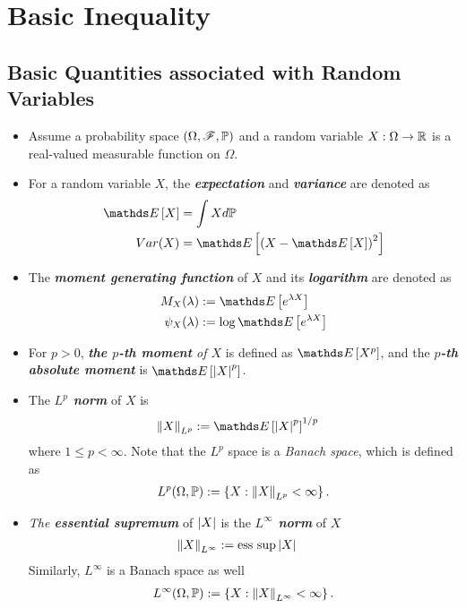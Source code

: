 \documentclass[11pt]{article}
\begin{document}
\section{Basic Inequality}
\subsection{Basic Quantities associated with Random Variables}
\begin{itemize}
\item Assume a probability space $(\Omega, {\mathscr F}, {\mathbb P})$ and a random variable $X: \Omega \to {\mathbb R}$ is a real-valued measurable function on $\Omega$.

\item For a random variable $X$, the \emph{\textbf{expectation}} and \emph{\textbf{variance}} are denoted as
\begin{align*}
\E{}{X} &= \int X d\bP \\
Var(X) &= \E{}{\paren{X - \E{}{X}}^2}
\end{align*}

\item The \emph{\textbf{moment generating function}} of $X$ and its \emph{\textbf{logarithm}} are denoted as
\begin{align*}
M_{X}(\lambda) &:= \E{}{e^{\lambda X}} \\
\psi_{X}(\lambda) &:= \log   \E{}{e^{\lambda X}}
\end{align*}

\item For $p > 0$, \emph{\textbf{the $p$-th moment} of $X$} is defined as $\E{}{X^p}$, and the \emph{\textbf{$p$-th absolute moment}} is $\E{}{\abs{X}^p}$.

\item The \emph{\textbf{$L^p$ norm}} of $X$ is
\begin{align*}
\norm{X}{L^p} &:= \E{}{\abs{X}^p}^{1/p}
\end{align*} where $1 \le p  < \infty$. Note that the $L^p$ space is a \emph{Banach space}, which is defined as
\begin{align*}
L^{p}(\Omega, {\mathbb P}) := \left\{X: \left\|X\right\|_{L^p} < \infty \right\}.
\end{align*}

\item \emph{The \textbf{essential supremum}} of $\left\lvert X \right\rvert$ is the \emph{\textbf{$L^\infty$ norm}} of $X$
\begin{align*}
\left\|X\right\|_{L^\infty} &:= \text{ess sup}\left\lvert X \right\rvert
\end{align*} Similarly, $L^{\infty}$ is a Banach space as well
\begin{align*}
L^{\infty}(\Omega, {\mathbb P}) := \left\{X: \left\|X\right\|_{L^\infty} < \infty \right\}.
\end{align*}


\end{itemize}
\end{document}
